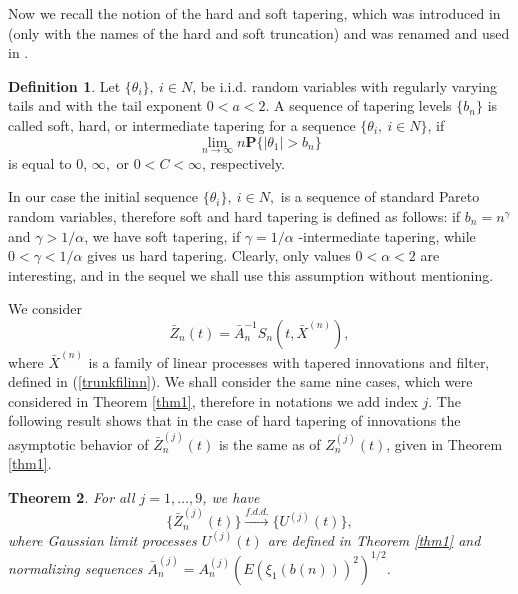 \documentclass[12pt]{article}
\def\a{\alpha}
\def\b{\beta}
\def\g{\gamma}
\def\fdd{\stackrel{f.d.d.}{\longrightarrow}}
\newcommand{\PP}{\mathbf{P}}
\theoremstyle{plain}
\newtheorem{teo}{Theorem}
\theoremstyle{definition}
\newtheorem{definition}[teo]{Definition}
\begin{document}
Now we recall the notion of the hard and soft tapering, which was introduced in \cite{Chakrabarty} (only with the names of the hard and soft truncation) and was renamed and used in \cite{Paul21}.
\begin{definition}\label{def1} Let  $\{\theta_i \}, \ i\in N$, be i.i.d. random variables with regularly varying tails and with the tail exponent $0<a<2$. A sequence of tapering levels $\{b_n\}$ is called soft, hard, or intermediate tapering for a sequence $\{\theta_i, \ i\in N \}$,  if
$$%
\lim_{n\to \infty} n\PP\{|\theta_1|>b_n\}
$$%
 is equal to $0$,  $\infty,$ or $0<C<\infty$, respectively.
\end{definition}
 In our case the initial sequence $\{\theta_i\}, \ i\in N,$ is a sequence of standard Pareto random variables, therefore soft and hard tapering is defined as follows: if $b_n=n^\g$ and $\g>1/\a$, we have soft tapering, if $\g=1/\a$ -intermediate tapering, while $0<\g<1/\a$ gives us hard tapering. Clearly, only values $0<\a<2$ are interesting, and in the sequel we shall use this assumption without mentioning.

We consider
$$
{\bar Z}_n(t)={\bar A}_n^{-1} S_n(t, {\bar X}^{(n)}),
$$
where ${\bar X}^{(n)}$ is a family of linear processes with tapered innovations and filter, defined in (\ref{trunkfilinn}). We shall consider the same nine cases, which were considered in Theorem \ref{thm1}, therefore in notations we add index $j$. The following result  shows that in the case of hard tapering of innovations the asymptotic behavior of ${\bar Z}_n^{(j)}(t)$ is the same as of $Z_n^{(j)}(t)$, given in Theorem \ref{thm1}.

\begin{teo}\label{thm2}  For all $j=1,\dots , 9$, we have
$$%
\{{\bar Z}_n^{(j)}(t)\}\fdd \{U^{(j)}(t)\},
$$%
where   Gaussian limit processes $U^{(j)}(t)$ are defined in Theorem \ref{thm1} and normalizing sequences ${\bar A}_n^{(j)}=A_n^{(j)}(E(\xi_{1}(b(n)))^2)^{1/2}$.
\end{teo}
\end{document}
